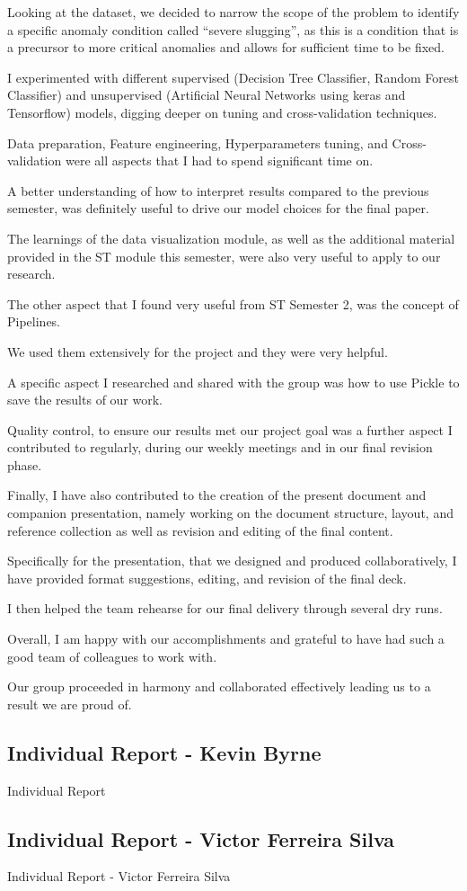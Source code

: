 \documentclass{article}
\begin{document}
Looking at the dataset, we decided to narrow the scope of the problem to identify a specific anomaly condition called “severe slugging”, as this is a condition that is a precursor to more critical anomalies and allows for sufficient time to be fixed.

I experimented with different supervised (Decision Tree Classifier, Random Forest Classifier) and unsupervised (Artificial Neural Networks using keras and Tensorflow) models, digging deeper on tuning and cross-validation techniques.

Data preparation, Feature engineering, Hyperparameters tuning, and Cross-validation were all aspects that I had to spend significant time on.

A better understanding of how to interpret results compared to the previous semester, was definitely useful to drive our model choices for the final paper.

The learnings of the data visualization module, as well as the additional material provided in the ST module this semester, were also very useful to apply to our research.

The other aspect that I found very useful from ST Semester 2, was the concept of Pipelines.

We used them extensively for the project and they were very helpful.

A specific aspect I researched and shared with the group was how to use Pickle to save the results of our work.

Quality control, to ensure our results met our project goal was a further aspect I contributed to regularly, during our weekly meetings and in our final revision phase.

Finally, I have also contributed to the creation of the present document and companion presentation, namely working on the document structure, layout, and reference collection as well as revision and editing of the final content.

Specifically for the presentation, that we designed and produced collaboratively, I have provided format suggestions, editing, and revision of the final deck.

I then helped the team rehearse for our final delivery through several dry runs.

Overall, I am happy with our accomplishments and grateful to have had such a good team of colleagues to work with.

Our group proceeded in harmony and collaborated effectively leading us to a result we are proud of.

\subsection{Individual Report - Kevin Byrne}
Individual Report 

\subsection{Individual Report - Victor Ferreira Silva}
Individual Report - Victor Ferreira Silva
\end{document}
